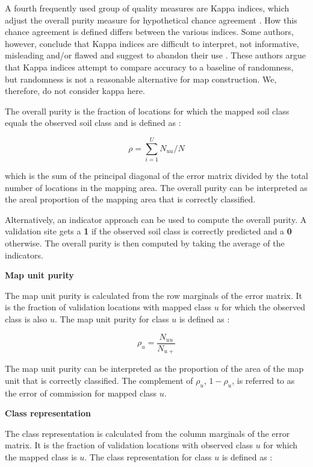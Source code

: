 \documentclass[10pt,b5paper,]{book}
\theoremstyle{definition}
\theoremstyle{definition}
\theoremstyle{definition}
\theoremstyle{remark}
\begin{document}
A fourth frequently used group of quality measures are Kappa indices,
which adjust the overall purity measure for hypothetical chance
agreement \citep{stehman1997selecting}. How this chance agreement is
defined differs between the various indices. Some authors, however,
conclude that Kappa indices are difficult to interpret, not informative,
misleading and/or flawed and suggest to abandon their use
\citep{pontius2011death}. These authors argue that Kappa indices attempt
to compare accuracy to a baseline of randomness, but randomness is not a
reasonable alternative for map construction. We, therefore, do not
consider kappa here.

The overall purity is the fraction of locations for which the mapped
soil class equals the observed soil class and is defined as
\citep{brus2011sampling}:

\begin{equation}
\rho = \sum_{i=1}^{U} N_{uu} / N
\end{equation}

which is the sum of the principal diagonal of the error matrix divided
by the total number of locations in the mapping area. The overall purity
can be interpreted as the areal proportion of the mapping area that is
correctly classified.

Alternatively, an indicator approach can be used to compute the overall
purity. A validation site gets a \textbf{1} if the observed soil class
is correctly predicted and a \textbf{0} otherwise. The overall purity is
then computed by taking the average of the indicators.

\textbf{Map unit purity}

The map unit purity is calculated from the row marginals of the error
matrix. It is the fraction of validation locations with mapped class
\(u\) for which the observed class is also \(u\). The map unit purity
for class \(u\) is defined as \citep{brus2011sampling}:

\begin{equation}
\rho_u = \frac{ N_{uu}}{N_{u+}}
\end{equation}

The map unit purity can be interpreted as the proportion of the area of
the map unit that is correctly classified. The complement of \(\rho_u\),
\(1 - \rho_u\), is referred to as the error of commission for mapped
class \(u\).

\textbf{Class representation}

The class representation is calculated from the column marginals of the
error matrix. It is the fraction of validation locations with observed
class \(u\) for which the mapped class is \(u\). The class
representation for class \(u\) is defined as \citep{brus2011sampling}:
\end{document}

